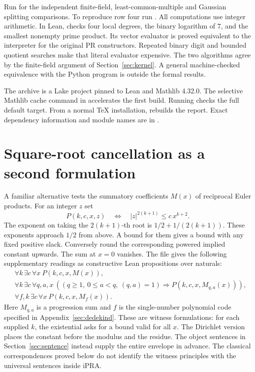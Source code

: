 \documentclass[11pt]{article}
\begin{document}
Run  for the independent finite-field, least-common-multiple and Gaussian splitting comparisons. To reproduce row four run . All computations use integer arithmetic. In Lean,  checks four local degrees, the binary logarithm of \(7\), and the smallest nonempty prime product. Its vector evaluator is proved equivalent to the interpreter for the original PR constructors. Repeated binary digit and bounded quotient searches make that literal evaluator expensive. The two algorithms agree by the finite-field argument of Section~\ref{sec:kernel}. A general machine-checked equivalence with the Python program is outside the formal results.

The archive is a Lake project pinned to Lean and Mathlib 4.32.0. The selective Mathlib cache command in  accelerates the first build. Running  checks the full default target. From a normal TeX installation,  rebuilds the report. Exact dependency information and module names are in .

\newpage









\appendix\newpage
\section{Square-root cancellation as a second formulation}\label{sec:mertens-start}
A familiar alternative tests the summatory coefficients \(M(x)\) of reciprocal Euler products. For an integer \(z\) set
\[
    P(k,c,x,z)\quad\Longleftrightarrow\quad
     |z|^{2(k+1)}\le c\,x^{k+2}.
\]
The exponent on taking the \(2(k+1)\)-th root is \(1/2+1/(2(k+1))\). These exponents approach \(1/2\) from above. A bound for them gives a bound with any fixed positive slack. Conversely round the corresponding powered implied constant upwards. The sum at \(x=0\) vanishes. The file  gives the following supplementary readings as constructive Lean propositions over naturals:
\begin{align*}
 &\forall k\,\exists c\,\forall x\ P(k,c,x,M(x)),\\
 &\forall k\,\exists c\,\forall q,a,x\
    ((q\ge1,\ 0\le a<q,\ (q,a)=1)\Rightarrow P(k,c,x,M_{q,a}(x))),\\
 &\forall f,k\,\exists c\,\forall x\ P(k,c,x,M_f(x)).
\end{align*}
Here \(M_{q,a}\) is a progression sum and \(f\) is the single-number polynomial code specified in Appendix~\ref{sec:dedekind}. These are witness formulations: for each supplied \(k\), the existential asks for a bound valid for all \(x\). The Dirichlet version places the constant before the modulus and the residue. The object sentences in Section~\ref{sec:sentence} instead supply the entire envelope in advance. The classical correspondences proved below do not identify the witness principles with the universal sentences inside iPRA.
\end{document}
